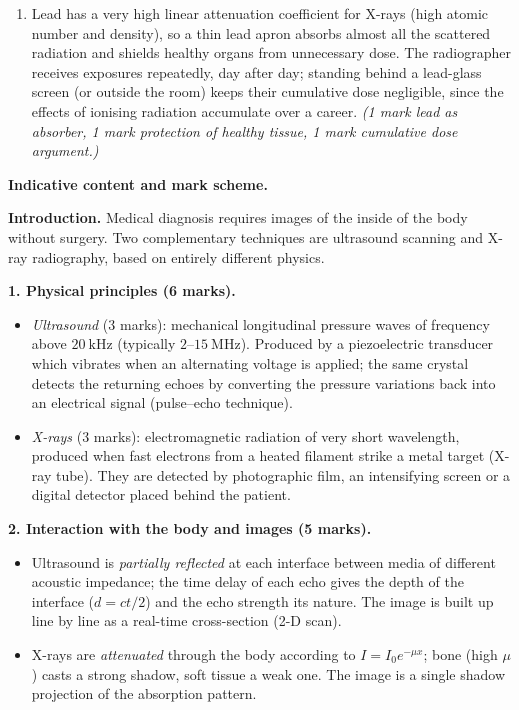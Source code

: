 \documentclass[11pt]{article}
\newcommand{\cle}[1]{{\popxbold\color{popdark}#1}}
\begin{document}
\begin{corrige}
\begin{enumerate}
\begin{enumerate}
\end{enumerate}
\item Lead has a very high linear attenuation coefficient for X-rays (high atomic number and density), so a thin lead apron absorbs almost all the scattered radiation and shields healthy organs from unnecessary dose. The radiographer receives exposures repeatedly, day after day; standing behind a lead-glass screen (or outside the room) keeps their cumulative dose negligible, since the effects of ionising radiation accumulate over a career. \emph{(1 mark lead as absorber, 1 mark protection of healthy tissue, 1 mark cumulative dose argument.)}
\end{enumerate}
\end{corrige}

\begin{corrige}
\textbf{Indicative content and mark scheme.}

\textbf{Introduction.} Medical diagnosis requires images of the inside of the body without surgery. Two complementary techniques are ultrasound scanning and X-ray radiography, based on entirely different physics.

\textbf{1. Physical principles (6 marks).}
\begin{itemize}
\item \emph{Ultrasound} (3 marks): mechanical longitudinal pressure waves of frequency above $20\ \mathrm{kHz}$ (typically $2$--$15\ \mathrm{MHz}$). Produced by a \cle{piezoelectric} transducer which vibrates when an alternating voltage is applied; the same crystal detects the returning echoes by converting the pressure variations back into an electrical signal (pulse--echo technique).
\item \emph{X-rays} (3 marks): electromagnetic radiation of very short wavelength, produced when fast electrons from a heated filament strike a metal target (X-ray tube). They are detected by photographic film, an intensifying screen or a digital detector placed behind the patient.
\end{itemize}

\textbf{2. Interaction with the body and images (5 marks).}
\begin{itemize}
\item Ultrasound is \emph{partially reflected} at each interface between media of different acoustic impedance; the time delay of each echo gives the depth of the interface ($d = ct/2$) and the echo strength its nature. The image is built up line by line as a real-time cross-section (2-D scan).
\item X-rays are \emph{attenuated} through the body according to $I = I_0 e^{-\mu x}$; bone (high $\mu$) casts a strong shadow, soft tissue a weak one. The image is a single shadow projection of the absorption pattern.
\end{itemize}


\end{corrige}
\end{document}

